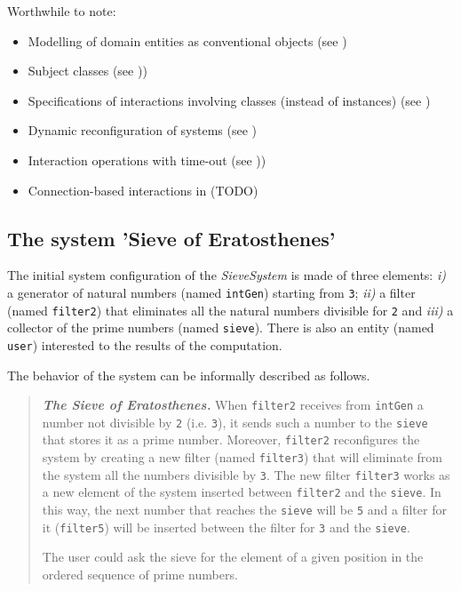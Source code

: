 \documentclass{../llncs}
\begin{document}
Worthwhile to note:

\begin{itemize}
\item Modelling of domain entities as conventional objects (see )
\item Subject classes (see ))
\item Specifications of interactions involving classes (instead of instances) (see )
\item Dynamic reconfiguration of \contact{} systems (see )
\item Interaction operations with time-out (see ))
\item Connection-based interactions in \contact{} (TODO)
\end{itemize}
\subsection{The system 'Sieve of Eratosthenes'  }
The initial system configuration of the \emph{SieveSystem} is made of three elements: \emph{i)} a generator of natural numbers (named \texttt{intGen}) starting from \texttt{3}; \emph{ii)} a filter (named \texttt{filter2}) that eliminates all the natural numbers divisible for \texttt{2} and \emph{iii)} a collector of the prime numbers (named \texttt{sieve}). There is also an entity (named \texttt{user}) interested to the results of the computation.

The behavior of the system can be informally described as follows.
\begin{quotation}
\footnotesize
\noindent
\textit{\textbf{The Sieve of Eratosthenes.}}
When \texttt{filter2} receives from \texttt{intGen} a number not divisible by \texttt{2} (i.e. \texttt{3}), it sends such a number to the \texttt{sieve} that stores it as a prime number. Moreover, \texttt{filter2} reconfigures the system by creating a new filter (named \texttt{filter3}) that will eliminate from the system all the numbers divisible by \texttt{3}. The new filter \texttt{filter3} works as a new element of the system inserted between \texttt{filter2} and the \texttt{sieve}. In this way, the next number that reaches the \texttt{sieve} will be \texttt{5} and a filter for it (\texttt{filter5}) will be inserted between the filter for \texttt{3} and the \texttt{sieve}. 

The user could ask the sieve for the element of a given position in the ordered sequence of prime numbers.

\noindent
\normalsize
\end{quotation}
\end{document}
